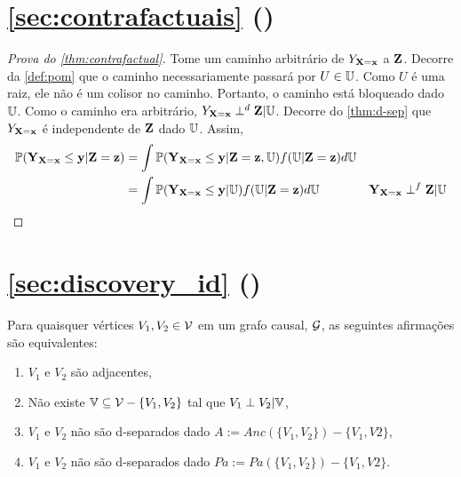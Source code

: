 \section{\cref{sec:contrafactuais} ()}

\begin{proof}[Prova do \cref{thm:contrafactual}]
 Tome um caminho arbitrário de $Y_{{\mathbf{X}}={\mathbf{x}}}$ a ${\mathbf{Z}}$.
 Decorre da \cref{def:pom} que 
 o caminho necessariamente passará por $U \in {\mathbb U}$.
 Como $U$ é uma raiz, ele não é
 um colisor no caminho. Portanto,
 o caminho está bloqueado dado ${\mathbb U}$.
 Como o caminho era arbitrário,
 $Y_{{\mathbf{X}}={\mathbf{x}}} \perp^d {\mathbf{Z}} | {\mathbb U}$.
 Decorre do \cref{thm:d-sep} que
 $Y_{{\mathbf{X}}={\mathbf{x}}}$ é independente de ${\mathbf{Z}}$ dado ${\mathbb U}$.
 Assim,
 \begin{align*}
  {\mathbb P}({\mathbf{Y}}_{{\mathbf{X}}={\mathbf{x}}} \leq {\mathbf{y}}|{\mathbf{Z}}={\mathbf{z}})
  &= \int {\mathbb P}({\mathbf{Y}}_{{\mathbf{X}}={\mathbf{x}}} \leq {\mathbf{y}}|{\mathbf{Z}}={\mathbf{z}},{\mathbb U})f({\mathbb U}|{\mathbf{Z}}={\mathbf{z}})d{\mathbb U} \\
  &= \int {\mathbb P}({\mathbf{Y}}_{{\mathbf{X}}={\mathbf{x}}} \leq {\mathbf{y}}|{\mathbb U})f({\mathbb U}|{\mathbf{Z}}={\mathbf{z}})d{\mathbb U}
  & {\mathbf{Y}}_{{\mathbf{X}}={\mathbf{x}}} \perp^f {\mathbf{Z}} | {\mathbb U}
 \end{align*}
\end{proof}

\section{\cref{sec:discovery_id} ()}

\begin{lemma}
 \label{lemma:ident_1}
 Para quaisquer vértices $V_1, V_2 \in {\mathcal V}$
 em um grafo causal, ${\mathcal G}$,
 as seguintes afirmações são equivalentes:
 \begin{enumerate}
  \item $V_1$ e $V_2$ são adjacentes,
  \item Não existe ${\mathbb V} \subseteq {\mathcal V} - \{V_1,V_2\}$ tal que
  $V_1 \perp V_2 | {\mathbb V}$,
  \item $V_1$ e $V_2$ não são d-separados dado 
  $A := Anc(\{V_1,V_2\}) - \{V_1,V2\}$,
  \item $V_1$ e $V_2$ não são d-separados dado 
  $Pa := Pa(\{V_1,V_2\}) - \{V_1,V2\}$.
 \end{enumerate}
\end{lemma}

